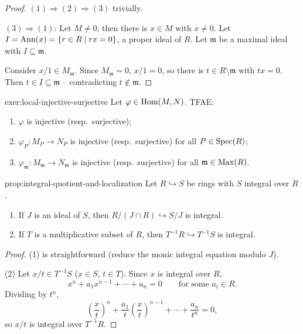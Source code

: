 \begin{proof}
$(1)\Rightarrow(2)\Rightarrow(3)$ trivially.

$(3)\Rightarrow(1)$: Let $M \neq 0$; then there is $x \in M$ with $x \neq 0$. Let $I = \operatorname{Ann}(x) = \{r \in R \mid rx=0\}$, a proper ideal of $R$. Let $\mathfrak m$ be a maximal ideal with $I \subseteq \mathfrak m$.

Consider $x/1 \in M_{\mathfrak m}$. Since $M_{\mathfrak m}=0$, $x/1=0$, so there is $t \in R\setminus\mathfrak m$ with $tx=0$. Then $t \in I \subseteq \mathfrak m$ -- contradicting $t \notin \mathfrak m$.
\end{proof}

\begin{exercise}{}{exer:local-injective-surjective}
Let $\varphi \in \operatorname{Hom}(M,N)$. TFAE:
\begin{enumerate}[label=(\arabic*)]
    \item $\varphi$ is injective (resp.\ surjective);
    \item $\varphi_P: M_P \to N_P$ is injective (resp.\ surjective) for all $P \in \operatorname{Spec}(R)$;
    \item $\varphi_{\mathfrak m}: M_{\mathfrak m} \to N_{\mathfrak m}$ is injective (resp.\ surjective) for all $\mathfrak m \in \operatorname{Max}(R)$.
\end{enumerate}
\end{exercise}

\begin{proposition}{}{prop:integral-quotient-and-localization}
Let $R \hookrightarrow S$ be rings with $S$ integral over $R$.
\begin{enumerate}[label=(\arabic*)]
    \item If $J$ is an ideal of $S$, then $R/(J\cap R) \hookrightarrow S/J$ is integral.
    \item If $T$ is a multiplicative subset of $R$, then $T^{-1}R \hookrightarrow T^{-1}S$ is integral.
\end{enumerate}
\end{proposition}

\begin{proof}
(1) is straightforward (reduce the monic integral equation modulo $J$).

(2) Let $x/t \in T^{-1}S$ ($x \in S$, $t \in T$). Since $x$ is integral over $R$,
\[
x^n + a_1 x^{n-1} + \cdots + a_n = 0 \qquad \text{for some } a_i \in R.
\]
Dividing by $t^n$,
\[
\left(\frac xt\right)^n + \frac{a_1}{t}\left(\frac xt\right)^{n-1} + \cdots + \frac{a_n}{t^n} = 0,
\]
so $x/t$ is integral over $T^{-1}R$.
\end{proof}

